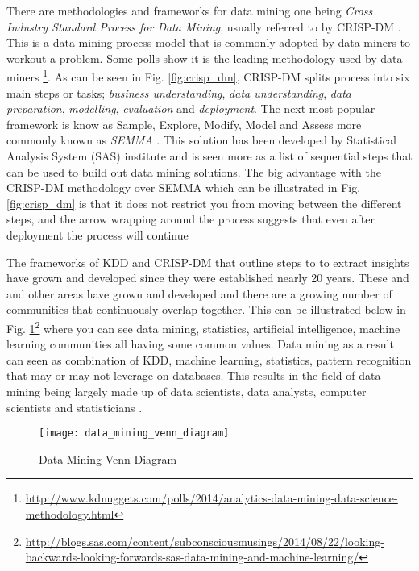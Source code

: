 There are methodologies and frameworks for data mining one being \textit{Cross Industry Standard Process for Data Mining}, usually referred to by CRISP-DM \citep{shearer_crisp-dm_2000}. This is a data mining process model that is commonly adopted by data miners to workout a problem. Some polls show it is the leading methodology used by data miners \footnote{\url{http://www.kdnuggets.com/polls/2014/analytics-data-mining-data-science-methodology.html}}. As can be seen in Fig. \ref{fig:crisp_dm}, CRISP-DM splits process into six main steps or tasks; \textit{business understanding}, \textit{data understanding}, \textit{data preparation}, \textit{modelling}, \textit{evaluation} and \textit{deployment}. The next most popular framework is know as Sample, Explore, Modify, Model and Assess more commonly known as \textit{SEMMA} \citep{azevedo_kdd_2008}. This solution has been developed by Statistical Analysis System (SAS) institute and is seen more as a list of sequential steps that can be used to build out data mining solutions. The big advantage with the CRISP-DM methodology over SEMMA which can be illustrated in Fig. \ref{fig:crisp_dm} is that it does not restrict you from moving between the different steps, and the arrow wrapping around the process suggests that even after deployment the process will continue  


The frameworks of KDD and CRISP-DM that outline steps to to extract insights have grown and developed since they were established nearly 20 years. These and and other areas have grown and developed and there are a growing number of communities that continuously overlap together. This can be illustrated below in Fig. \ref{fig:data_mining_venn_diagram}\footnote{\url{http://blogs.sas.com/content/subconsciousmusings/2014/08/22/looking-backwards-looking-forwards-sas-data-mining-and-machine-learning/}} where you can see data mining, statistics, artificial intelligence, machine learning communities all having some common values. Data mining as a result can seen as combination of KDD, machine learning, statistics, pattern recognition that may or may not leverage on databases. This results in the field of data mining being largely made up of data scientists, data analysts, computer scientists and statisticians \citep{coenen_data_2011}. 

\begin{figure}[H]
	\texttt{[image: data\_mining\_venn\_diagram]}
	\caption{Data Mining Venn Diagram}
	\label{fig:data_mining_venn_diagram}
\end{figure}

